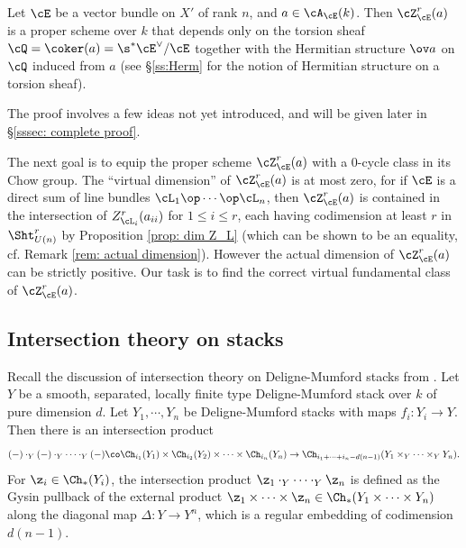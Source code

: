 \begin{prop}
\notready\label{prop: KR cycle proper}
Let $\cE$ be a vector bundle on $X'$ of rank $n$, and $a\in \cA_{\cE}(k)$. Then $\cZ^{r}_{\cE}(a)$ is a proper scheme over $k$ that depends only on the torsion sheaf $\cQ=\coker(a)=\s^{*}\cE^{\vee}/\cE$ together with the Hermitian structure $\ov a$ on $\cQ$ induced from $a$ (see \S\ref{ss:Herm} for the notion of Hermitian structure on a torsion sheaf).
\end{prop}
The proof involves a few ideas not yet introduced, and will be given later in \S \ref{sssec: complete proof}.



The next goal is to equip the proper scheme $\cZ_{\cE}^{r}(a)$ with a $0$-cycle class in its Chow group. The ``virtual dimension'' of $\cZ_{\cE}^{r}(a)$ is at most zero, for if $\cE$ is a direct sum of line bundles $\cL_{1}\op\cdots\op \cL_{n}$, then $\cZ_{\cE}^{r}(a)$ is contained in the intersection of $Z^{r}_{\cL_{i}}(a_{ii})$ for $1\le i\le r$, each having codimension at least $r$ in $\Sht^{r}_{U(n)}$ by Proposition \ref{prop: dim Z_L} (which can be shown to be an equality, cf. Remark \ref{rem: actual dimension}).  However the actual dimension of $\cZ_{\cE}^{r}(a)$ can be strictly positive. Our task is to find the correct virtual fundamental class of $\cZ_{\cE}^{r}(a)$.


\subsection{Intersection theory on stacks}\label{ss:int stacks}
Recall the discussion of intersection theory on Deligne-Mumford stacks from \cite[Appendix A]{YZ}. Let $Y$ be a smooth, separated, locally finite type  Deligne-Mumford stack over $k$ of pure dimension $d$. Let $Y_{1}, \cdots, Y_{n}$ be Deligne-Mumford stacks with maps $f_{i}: Y_{i}\to Y$. Then there is an intersection product
\[
(-) \cdot_{Y} (-)  \cdot_Y \cdots \cdot_Y (-) \co \Ch_{i_{1}}(Y_{1}) \times \Ch_{i_{2}}(Y_{2})\times\cdots\times\Ch_{i_{n}}(Y_{n}) \rightarrow \Ch_{i_{1}+\cdots+i_{n}-d(n-1)}(Y_{1}\times_{Y}\cdots\times_{Y}Y_{n}).
\]
For $\z_{i}\in \Ch_{*}(Y_{i})$, the intersection product $\z_{1}\cdot_{Y}\cdots\cdot_{Y}\z_{n}$ is defined as the Gysin pullback of the external product $\z_{1}\times\cdots\times \z_{n}\in \Ch_{*}(Y_{1}\times\cdots\times Y_{n})$ along the diagonal map $\Delta: Y\to Y^{n}$, which is a regular embedding of codimension $d(n-1)$.




